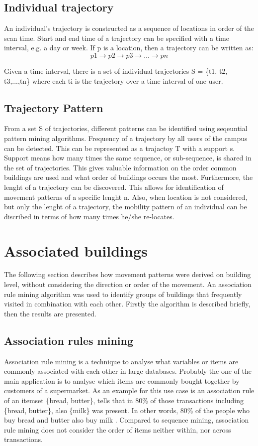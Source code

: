 \subsection{Individual trajectory}
An individual’s trajectory is constructed as a sequence of locations in order of the scan time. Start and end time of a trajectory can be specified with a time interval, e.g. a day or week. If p is a location, then a trajectory can be written as:
$$p1 \rightarrow p2 \rightarrow p3 \rightarrow …\rightarrow pn$$

Given a time interval, there is a set of individual trajectories S = \{t1, t2, t3,...,tn\} where each ti is the trajectory over a time interval of one user. 

\subsection{Trajectory Pattern}
From a set S of trajectories, different patterns can be identified using seqeuntial pattern mining algorithms. Frequency of a trajectory by all users of the campus can be detected. This can be represented as a trajactoy T with a support s. Support means how many times the same sequence, or sub-sequence, is shared in the set of trajectories. This gives valuable information on the order common buildings are used and what order of buildings occurs the most. Furthermore, the lenght of a trajectory can be discovered. This allows for identification of movement patterns of a specific lenght n. Also, when location is not considered, but only the lenght of a trajectory, the mobility pattern of an individual can be discribed in terms of how many times he/she re-locates. 

\section{Associated buildings}\label{Associated buildings}

The following section describes how movement patterns were derived on building level, without considering the direction or order of the movement. An association rule mining algorithm \citep{agrawal_mining_1993} was used to identify groups of buildings that frequently visited in combination with each other. Firstly the algorithm is described briefly, then the results are presented.
\subsection{Association rules mining}
Association rule mining is a technique to analyse what variables or items are commonly associated with each other in large databases. Probably the one of the main application is to analyse which items are commonly bought together by customers of a supermarket. As an example for this use case is an association rule of an itemset \{bread, butter\}, tells that in 80\% of those transactions including \{bread, butter\}, also \{milk\}  was present. In other words, 80\% of the people who buy bread and butter also buy milk \citep{agrawal_mining_1993}. Compared to sequence mining, association rule mining does not consider the order of items neither within, nor across transactions.

